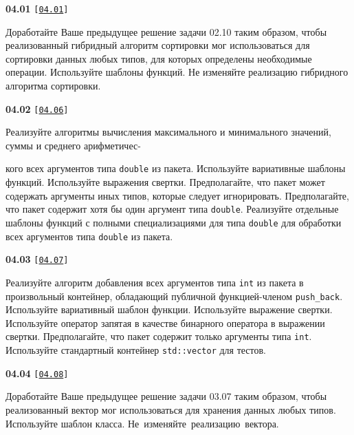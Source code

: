 \documentclass[a4paper,12pt]{article}
\begin{document}
{\large \textbf{04.01} \texttt{[\href{https://github.com/i-s-m-mipt/Education/blob/master/projects/examples/source/04.01.cpp}{\texttt{04.01}}]}}

\bigskip

Доработайте Ваше предыдущее решение задачи 02.10 таким образом, чтобы реализованный гибридный алгоритм сортировки мог использоваться для сортировки данных любых типов, для которых определены необходимые операции. Используйте шаблоны функций. Не изменяйте реализацию гибридного алгоритма сортировки.

\bigskip

{\large \textbf{04.02} \texttt{[\href{https://github.com/i-s-m-mipt/Education/blob/master/projects/examples/source/04.06.cpp}{\texttt{04.06}}]}}

\bigskip

Реализуйте алгоритмы вычисления максимального и минимального значений, суммы и среднего арифметичес- 

кого всех аргументов типа \lstinline{double} из пакета. Используйте вариативные шаблоны функций. Используйте выражения свертки. Предполагайте, что пакет может содержать аргументы иных типов, которые следует игнорировать. Предполагайте, что пакет содержит хотя бы один аргумент типа \lstinline{double}. Реализуйте отдельные шаблоны функций с полными специализациями для типа \lstinline{double} для обработки всех аргументов типа \lstinline{double} из пакета.

\bigskip

{\large \textbf{04.03} \texttt{[\href{https://github.com/i-s-m-mipt/Education/blob/master/projects/examples/source/04.07.cpp}{\texttt{04.07}}]}}

\bigskip

Реализуйте алгоритм добавления всех аргументов типа \lstinline{int} из пакета в произвольный контейнер, обладающий публичной функцией-членом \lstinline{push_back}. Используйте вариативный шаблон функции. Используйте выражение свертки. Используйте оператор запятая в качестве бинарного оператора в выражении свертки. Предполагайте, что пакет содержит только аргументы типа \lstinline{int}. Используйте стандартный контейнер \lstinline{std::vector} для тестов.

\bigskip

{\large \textbf{04.04} \texttt{[\href{https://github.com/i-s-m-mipt/Education/blob/master/projects/examples/source/04.08.cpp}{\texttt{04.08}}]}}

\bigskip

Доработайте Ваше предыдущее решение задачи 03.07 таким образом, чтобы реализованный вектор мог использоваться для хранения данных любых типов. Используйте шаблон класса. Не~изменяйте~реализацию~вектора.
\end{document}
